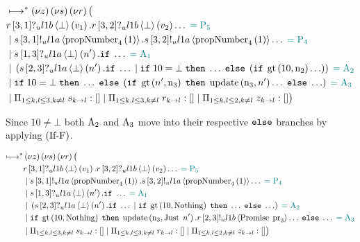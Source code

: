 \begin{align*}
&\mapstostar
\NuChannels \big (\\
&\ReceiveUnreliableP{\ChannelR}{3}{1}{\LOneB}{\bot}{v_1}.\ReceiveUnreliableP{\ChannelR}{3}{2}{\LOneB}{\bot}{v_2}\ldots \comment{= \Proposer{5}}\\
&\Or  \SendUnreliableP{\ChannelS}{3}{1}{\LOneA}{\proposalNumber{1}{4}}.\SendUnreliableP{\ChannelS}{3}{2}{\LOneA}{\proposalNumber{1}{4}}\ldots \comment{= \Proposer{4}}\\
&\Or  \ReceiveUnreliableP{\ChannelS}{1}{3}{\LOneA}{\bot}{n'}.\If \ldots \comment{=\Acceptor{1}}\\
&\Or
    \Paren{
        \ReceiveUnreliableP{\ChannelS}{2}{3}{\LOneA}{\bot}{n'}.\If \ldots
        \Or
            \If 10 = \bot
            \;\Then \ldots
            \;\Else \Paren{
                \If \greaterThan{10}{\NumberRegister_2} \ldots
                }
    } \comment{=\Acceptor{2}}\\
&\Or \If 10 = \bot
        \;\Then \ldots
        \;\Else \Paren{
            \If \greaterThan{n'}{\NumberRegister_3}
            \;\Then \update{\NumberRegister_3}{n'}\ldots
            \;\Else \ldots
        } \comment{=\Acceptor{3}}\\
&\Or \InnerSessionQueues{\ChannelS}
\Or \InnerSessionQueues{\ChannelR}
\Or \OuterSessionQueues
\big )
\end{align*}

Since $10 \neq \bot$ both $\Acceptor{2}$ and $\Acceptor{3}$ move into their respective $\ElseName$ branches by applying $\RIfF$.

\begin{align*}
\mapstostar& \NuChannels \big (\\
&\ReceiveUnreliableP{\ChannelR}{3}{1}{\LOneB}{\bot}{v_1}.\ReceiveUnreliableP{\ChannelR}{3}{2}{\LOneB}{\bot}{v_2}\ldots \comment{= \Proposer{5}}\\
&\Or \SendUnreliableP{\ChannelS}{3}{1}{\LOneA}{\proposalNumber{1}{4}}.\SendUnreliableP{\ChannelS}{3}{2}{\LOneA}{\proposalNumber{1}{4}}\ldots \comment{= \Proposer{4}}\\
&\Or \ReceiveUnreliableP{\ChannelS}{1}{3}{\LOneA}{\bot}{n'}.\If \ldots \comment{=\Acceptor{1}}\\
&\Or \Paren{
    \ReceiveUnreliableP{\ChannelS}{2}{3}{\LOneA}{\bot}{n'}.\If \ldots
    \Or
    \If \greaterThan{10}{\Nothing}
    \;\Then \ldots
    \;\Else \ldots
} \comment{=\Acceptor{2}}\\
&\Or
    \If \greaterThan{10}{\Nothing}
    \;\Then
        \update{\NumberRegister_3}{\Just{n'}}.
        \SendUnreliableP{\ChannelR}{2}{3}{\LOneB}{\Promise{\ProposalRegister_3}}\ldots
    \;\Else \ldots
    \comment{=\Acceptor{3}}\\
&\Or \InnerSessionQueues{\ChannelS}
\Or \InnerSessionQueues{\ChannelR}
\Or \OuterSessionQueues
\big )
\end{align*}

